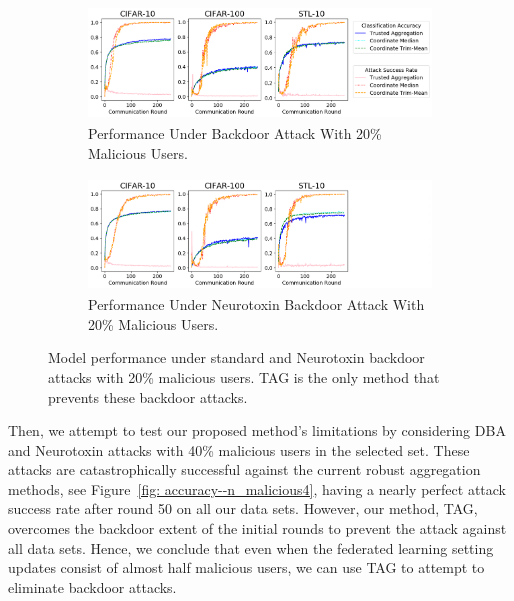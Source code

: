 \documentclass{article} %
\begin{document}
\begin{figure}[htp]
\centering
  \begin{subfigure}{\textwidth}
  \centering
    \includegraphics[height=3cm, width=\textwidth]{make_article/make_visuals/visuals/accuracy--n_malicious2--dba1--beta0.2--d_scale.png}
    \caption{\footnotesize Performance Under Backdoor Attack With 20\% Malicious Users.}
  \end{subfigure}%

  \begin{subfigure}{\textwidth}
  \centering
    \includegraphics[height=3cm, width=\textwidth]{make_article/make_visuals/visuals/accuracy--n_malicious2--dba1--beta0.2--d_scale--neuro_p0.1_nolegend.png}
    \caption{\footnotesize Performance Under Neurotoxin Backdoor Attack With 20\% Malicious Users.}
  \end{subfigure}%
\caption{\footnotesize Model performance under standard and Neurotoxin backdoor attacks with 20\% malicious users. TAG is the only method that prevents these backdoor attacks.} 
\label{fig: accuracy--n_malicious2}
\end{figure}

Then, we attempt to test our proposed method's limitations by considering DBA and Neurotoxin attacks with 40\% malicious users in the selected set.  These attacks are catastrophically successful against the current robust aggregation methods, see Figure~\ref{fig: accuracy--n_malicious4}, having a nearly perfect attack success rate after round 50 on all our data sets. However, our method, TAG, overcomes the backdoor extent of the initial rounds to prevent the attack against all data sets. Hence, we conclude that even when the federated learning setting updates consist of almost half malicious users, we can use TAG to attempt to eliminate backdoor attacks.
\end{document}

